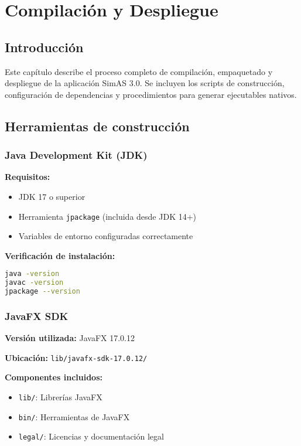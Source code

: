 \chapter{Compilación y Despliegue}\label{cap-compilacion-despliegue}

\section{Introducción}

Este capítulo describe el proceso completo de compilación, empaquetado y despliegue de la aplicación SimAS 3.0. Se incluyen los scripts de construcción, configuración de dependencias y procedimientos para generar ejecutables nativos.

\section{Herramientas de construcción}

\subsection{Java Development Kit (JDK)}

\textbf{Requisitos:}
\begin{itemize}
    \item JDK 17 o superior
    \item Herramienta \texttt{jpackage} (incluida desde JDK 14+)
    \item Variables de entorno configuradas correctamente
\end{itemize}

\textbf{Verificación de instalación:}
\begin{lstlisting}[language=bash, caption=Verificación del JDK]
java -version
javac -version
jpackage --version
\end{lstlisting}

\subsection{JavaFX SDK}

\textbf{Versión utilizada:} JavaFX 17.0.12

\textbf{Ubicación:} \texttt{lib/javafx-sdk-17.0.12/}

\textbf{Componentes incluidos:}
\begin{itemize}
    \item \texttt{lib/}: Librerías JavaFX
    \item \texttt{bin/}: Herramientas de JavaFX
    \item \texttt{legal/}: Licencias y documentación legal
\end{itemize}


